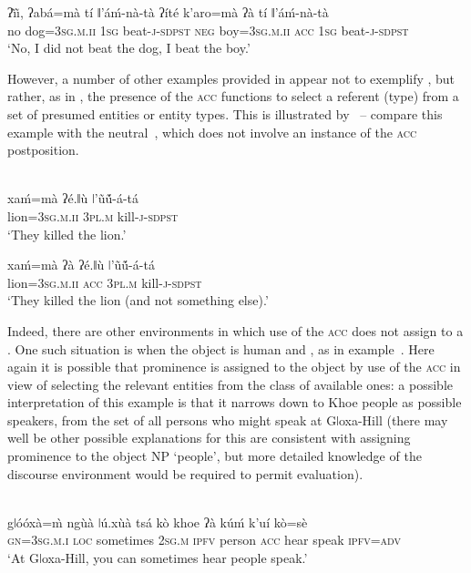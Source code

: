 \documentclass[output=paper]{LSP/langsci}
\begin{document}
\ex  \label{09-mc-ex:27}
\gll ʔ\~\i\~\i, ʔabá=mà tí ǁ’áḿ-nà-tà ʔíté k’aro=mà ʔà tí ǁ’áḿ-nà-tà\\
no dog=3\textsc{sg}.\textsc{m.ii} 1\textsc{sg} beat-\textsc{j}-\textsc{sdpst} \textsc{neg} boy=3\textsc{sg}.\textsc{m.ii} \textsc{acc} 1\textsc{sg} beat-\textsc{j}-\textsc{sdpst}\\
\glt ‘No, I did not beat the dog, I beat the boy.’
\z
\z

However, a number of other examples provided in \citet{Fehn2014Grammar} appear not to exemplify , but rather, as in , the presence of the \textsc{acc} functions to select a referent (type) from a set of presumed entities or entity types. This is illustrated by~ – compare this example with the neutral~, which does not involve an instance of the \textsc{acc} postposition.

\ea {}\\
\ea \label{09-mc-ex:28}
\gll xaḿ=mà ʔé.ǁù ǀ’\~uṹ-á-tá\\
lion=3\textsc{sg}.\textsc{m.ii} 3\textsc{pl.m} kill-\textsc{j}-\textsc{sdpst}\\
\glt ‘They killed the lion.’

\ex\label{09-mc-ex:29}
\gll xaḿ=mà ʔà ʔé.ǁù ǀ’\~uṹ-á-tá\\
lion=3\textsc{sg}.\textsc{m.ii} \textsc{acc} 3\textsc{pl.m} kill-\textsc{j}-\textsc{sdpst}\\
\glt ‘They killed the lion (and not something else).’
\z
\z

Indeed, there are other environments in which use of the \textsc{acc} does not assign  to a . One such situation is when the object is human and  \citep[232]{Fehn2014Grammar}, as in example~. Here again it is possible that prominence is assigned to the object by use of the \textsc{acc} in view of selecting the relevant entities from the class of available ones: a possible interpretation of this example is that it narrows down to Khoe people as possible speakers, from the set of all persons who might speak at Gǀoxa-Hill (there may well be other possible explanations for this are consistent with assigning prominence to the object NP ‘people’, but more detailed knowledge of the discourse environment would be required to permit evaluation).

\newpage 
\ea {}\\\label{09-mc-ex:30}
\gll gǀóóxà=\`{m} ngùà ǀú.xùà tsá kò khoe ʔà kúḿ k’uí  kò=sè\\
\textsc{gn}=3\textsc{sg}.\textsc{m.i} \textsc{loc} sometimes 2\textsc{sg.m} \textsc{ipfv} person \textsc{acc} hear speak \textsc{ipfv}=\textsc{adv}\\
\glt ‘At Gǀoxa-Hill, you can sometimes hear people speak.’
\z
\end{document}
